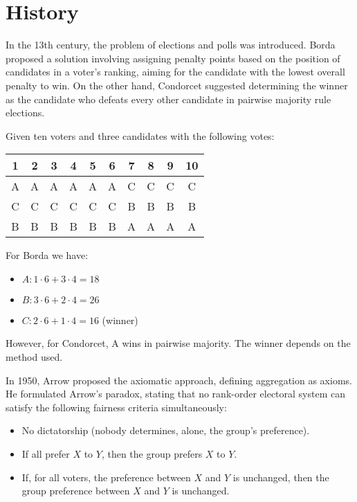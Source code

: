 \section{History}

In the 13th century, the problem of elections and polls was introduced. 
Borda proposed a solution involving assigning penalty points based on the position of candidates in a voter's ranking, aiming for the candidate with the lowest overall penalty to win. 
On the other hand, Condorcet suggested determining the winner as the candidate who defeats every other candidate in pairwise majority rule elections.
\begin{example}
    Given ten voters and three candidates with the following votes: 
    \begin{table}[H]
        \centering
        \begin{tabular}{|c|c|c|c|c|c|c|c|c|c|}
        \hline
        1 & 2 & 3 & 4 & 5 & 6 & 7 & 8 & 9 & 10 \\ \hline
        A & A & A & A & A & A & C & C & C & C  \\ 
        C & C & C & C & C & C & B & B & B & B  \\ 
        B & B & B & B & B & B & A & A & A & A  \\ \hline
        \end{tabular}
    \end{table}
    For Borda we have: 
    \begin{itemize}
        \item $A: 1 \cdot 6+3 \cdot 4 = 18$
        \item $B: 3 \cdot 6+2 \cdot 4 = 26$
        \item $C: 2 \cdot 6+1 \cdot 4 = 16$ (winner)
    \end{itemize}
    However, for Condorcet, A wins in pairwise majority. 
    The winner depends on the method used.
\end{example}
In 1950, Arrow proposed the axiomatic approach, defining aggregation as axioms.
He formulated Arrow's paradox, stating that no rank-order electoral system can satisfy the following fairness criteria simultaneously:
\begin{itemize}
    \item No dictatorship (nobody determines, alone, the group's preference). 
    \item If all prefer $X$ to $Y$, then the group prefers $X$ to $Y$. 
    \item If, for all voters, the preference between $X$ and $Y$ is unchanged, then the group preference between $X$ and $Y$ is unchanged. 
\end{itemize}
